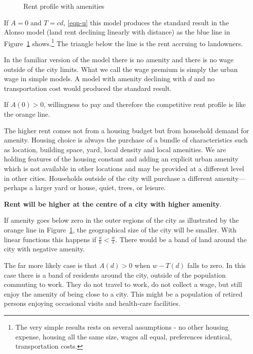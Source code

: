 \begin{figure}[htbp]
\begin{center}

\end{center}
\caption{Rent profile with amenities}
\label{fig-amenity}
\end{figure}

 If $A=0$ and $T=cd$,  \ref{eqn-u} this model produces the standard result in the Alonso model (land rent declining linearly with distance) as the blue line in Figure~\ref{fig-amenity} shows.\footnote{The very simple results rests on several assumptions - no other housing expense, housing all the same size, wages all equal, preferences identical, transportation costs.}  The triangle below the line is the rent accruing to landowners.

In the familiar version of the model there is no amenity and there is no wage outside of the city limits.
What we call the wage premium is simply the urban wage in simple models. A model with amenity declining with $d$ and no transportation cost would produced the  standard result. 

If $A(0)>0$, willingness to pay and therefore the competitive rent profile is like the orange line.  
  
The  higher rent comes not from a housing budget but from household demand for amenity.  Housing choice is always the purchase of  a bundle of characteristics such as location, building space, yard, local density and local amenities.  We are holding features of the housing constant and adding an explicit urban amenity which is not available in other locations and may be provided at a different level in other cities.  Households outside of the city will purchase a different amenity---perhaps a larger yard or house, quiet,  trees, or leisure. 
  
\textbf{Rent will be higher at the centre of a city with higher amenity}.   
    
   
If  amenity goes below zero in the outer regions of the city as illustrated by the orange line  in Figure~\ref{fig-amenity}, the geographical size of the  city will be smaller.  With  linear functions this happens if $\frac{a}{b} < \frac{w}{t}$. There would be a band of land around the city with negative amenity. 
  
The far more likely case is that $A(d) > 0$ when $w-T(d)$ falls to zero. In this case there is a band of  residents around the city, outside of the population commuting to work. They do not travel to work,  do not collect a wage, but still enjoy the amenity of being close to a city. This might be a population of retired persons enjoying occasional visits and health-care facilities.




